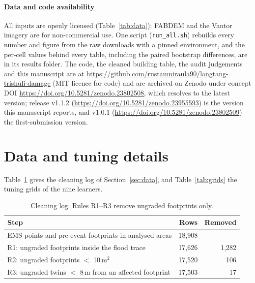 \documentclass[journal,a4paper]{IEEEtran}
\begin{document}
\paragraph{Data and code availability}
All inputs are openly licensed (Table~\ref{tab:data}); FABDEM and the Vantor imagery are for non-commercial use. One script (\texttt{run\_all.sh}) rebuilds every number and figure from the raw downloads with a pinned environment, and the per-cell values behind every table, including the paired bootstrap differences, are in its results folder. The code, the cleaned building table, the audit judgements and this manuscript are at \url{https://github.com/rustamniraula90/langtang-trishuli-damage} (MIT licence for code) and are archived on Zenodo under concept DOI \url{https://doi.org/10.5281/zenodo.23802508}, which resolves to the latest version; release v1.1.2 (\url{https://doi.org/10.5281/zenodo.23955593}) is the version this manuscript reports, and v1.0.1 (\url{https://doi.org/10.5281/zenodo.23802509}) the first-submission version.

\appendices
\section{Data and tuning details}\label{app:data}
Table~\ref{tab:clean} gives the cleaning log of Section~\ref{sec:data}, and Table~\ref{tab:grids} the tuning grids of the nine learners.

\begin{table}[t]
\centering\footnotesize
\setlength{\tabcolsep}{3pt}
\caption{Cleaning log. Rules R1--R3 remove ungraded footprints only.}\label{tab:clean}
\begin{tabular}{@{}lrr@{}}
\toprule
\textbf{Step} & \textbf{Rows} & \textbf{Removed}\\
\midrule
EMS points and pre-event footprints in analysed areas & 18,908 & --\\
R1: ungraded footprints inside the flood trace & 17,626 & 1,282\\
R2: ungraded footprints $<$ 10\,m$^2$ & 17,520 & 106\\
R3: ungraded twins $<$ 8\,m from an affected footprint & 17,503 & 17\\
\bottomrule
\end{tabular}
\end{table}
\end{document}
